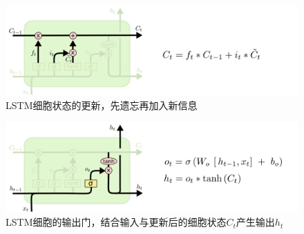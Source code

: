 \par
\begin{figure}[htbp!]
    \centering
    \includegraphics[width = 1.\textwidth]{chap/img/LSTM3-focus-C.png}
    \caption{
        LSTM细胞状态的更新，先遗忘再加入新信息\supercite{Understanding-LSTMs}
        }\label{fig:lstm_c}
\end{figure}
\par
\begin{figure}[htbp!]
    \centering
    \includegraphics[width = 1.\textwidth]{chap/img/LSTM3-focus-o.png}
    \caption{
        LSTM细胞的输出门，结合输入与更新后的细胞状态$C_t$产生输出$h_t$\supercite{Understanding-LSTMs}
        }\label{fig:lstm_o}
\end{figure}
\par

